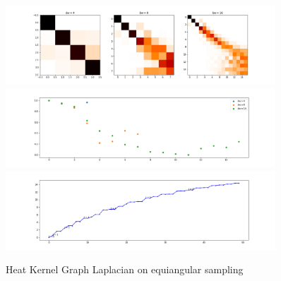\begin{figure}[h]
	\label{fig:HeatKernelGraphLaplacianEquiangular}
	\caption{Heat Kernel Graph Laplacian on equiangular sampling}
	\centering
	\includegraphics[width=0.9\textwidth]{../codes/02.HeatKernelGraphLaplacian/equiangular/equi_full.png}
	\includegraphics[width=0.9\textwidth]{../codes/02.HeatKernelGraphLaplacian/equiangular/equi_full_diagonal.png}	
	\includegraphics[width=0.9\textwidth]{../codes/02.HeatKernelGraphLaplacian/equiangular/equi_full_eigenvalues_16.png}	
\end{figure}

